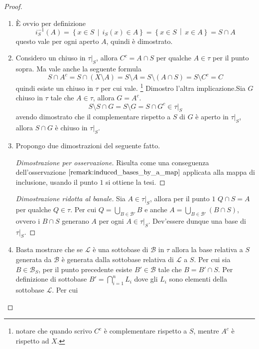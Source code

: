\begin{proof} \
\begin{enumerate}
	\item
		È ovvio per definizione
		\begin{equation*}
			i^{-1}_S(A) = \left\{x \in S \,\middle|\, i_S(x) \in A \right\} = \left\{x \in S \,\middle|\, x \in A\right\} = S \cap A
		\end{equation*}
		questo vale per ogni aperto $A$, quindi è dimostrato.
	\item 
		Considero un chiuso in $\tau|_S$, allora $C^c = A \cap S$ per qualche $A \in \tau$ per il punto sopra. Ma vale anche la seguente formula
		\begin{equation*}
			S \cap A^c = S \cap (X \setminus A) = S \setminus A = S \setminus (A \cap S) = S \setminus C^c = C 
		\end{equation*}
		quindi esiste un chiuso in $\tau$ per cui vale. \footnote{notare che quando scrivo $C^c$ è complementare rispetto a $S$, mentre $A^c$ è rispetto ad $X$.}
		Dimostro l'altra implicazione.Sia $G$ chiuso in $\tau$ tale che $A \in \tau$, allora $G = A^c$.
		\begin{equation*}
			S \setminus S \cap G = S \setminus G = S \cap G^c \in \tau|_S 
		\end{equation*}  
		avendo dimostrato che il complementare rispetto a $S$ di $G$ è aperto in $\tau|_S$, allora $S \cap G$ è chiuso in $\tau|_S$. 
	\item Propongo due dimostrazioni del seguente fatto.
	\begin{proof}[Dimostrazione per osservazione]
		Risulta come una conseguenza dell'osservazione $\ref{remark:induced_bases_by_a_map}$ applicata alla mappa di inclusione, usando il punto $1$ si ottiene la tesi.
	\end{proof}
	\begin{proof}[Dimostrazione ridotta al banale]
		Sia $A \in \tau|_S$, allora per il punto $1$ $Q \cap S = A$ per qualche $Q \in \tau$. Per cui $Q = \bigcup_{B \in \mathcal{B}'} B$ e anche $A = \bigcup_{B \in \mathcal{B}'} (B \cap S)$, ovvero i $B \cap S$ generano $A$ per ogni $A \in \tau|_S$. Dev'essere dunque una base di $\tau|_S$. 
	\end{proof}
	\item 
		Basta mostrare che se $\mathcal{L}$ è una sottobase di $\mathcal{B}$ in $\tau$ allora la base relativa a $S$ generata da $\mathcal{B}$ è generata dalla sottobase relativa di $\mathcal{L}$ a $S$. Per cui sia $B \in \mathcal{B}_S$, per il punto precedente esiste $B' \in \mathcal{B}$ tale che $B = B' \cap S$. Per definizione di sottobase $B' = \bigcap^{n}_{i =1}L_i$ dove gli $L_i$ sono elementi della sottobase $\mathcal{L}$. Per cui

\end{enumerate}
\end{proof}
